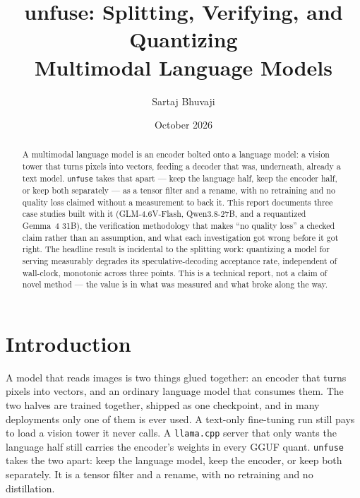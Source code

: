 \documentclass[11pt]{article}
\title{\bfseries unfuse: Splitting, Verifying, and Quantizing \\ Multimodal Language Models}
\author{Sartaj Bhuvaji}
\date{October 2026}
\begin{document}
\maketitle

\begin{abstract}
\noindent
A multimodal language model is an encoder bolted onto a language model: a vision tower
that turns pixels into vectors, feeding a decoder that was, underneath, already a text
model. \texttt{unfuse} takes that apart --- keep the language half, keep the encoder half,
or keep both separately --- as a tensor filter and a rename, with no retraining and no
quality loss claimed without a measurement to back it. This report documents three
case studies built with it (GLM-4.6V-Flash, Qwen3.8-27B, and a requantized Gemma~4 31B),
the verification methodology that makes ``no quality loss'' a checked claim rather than
an assumption, and what each investigation got wrong before it got right. The headline
result is incidental to the splitting work: quantizing a model for serving measurably
degrades its speculative-decoding acceptance rate, independent of wall-clock, monotonic
across three points. This is a technical report, not a claim of novel method --- the value
is in what was measured and what broke along the way.
\end{abstract}

\section{Introduction}
\label{sec:intro}

A model that reads images is two things glued together: an encoder that turns pixels
into vectors, and an ordinary language model that consumes them. The two halves are
trained together, shipped as one checkpoint, and in many deployments only one of them
is ever used. A text-only fine-tuning run still pays to load a vision tower it never
calls. A \texttt{llama.cpp} server that only wants the language half still carries the
encoder's weights in every GGUF quant. \texttt{unfuse} takes the two apart: keep the
language model, keep the encoder, or keep both separately. It is a tensor filter and a
rename, with no retraining and no distillation.
\end{document}
